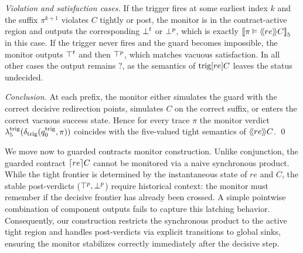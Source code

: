     \smallskip
    \emph{Violation and satisfaction cases.}
    If the trigger fires at some earliest index $k$ and the suffix $\pi^{k+1}$
    violates $C$ tightly or post, the monitor is in the contract-active region and
    outputs the corresponding $\bott$ or $\botp$, which is exactly
    $\semfive{\pi \vDash \trig[re]{C}}$ in this case.
    If the trigger never fires and the guard becomes impossible, the monitor
    outputs $\topt$ and then $\topp$, which matches vacuous satisfaction.
    In all other cases the output remains $\mathsf{?}$, as the semantics of
    $\trigg[re]{C}$ leaves the status undecided.
    
    \smallskip
    \emph{Conclusion.}
    At each prefix, the monitor either simulates the guard with the correct decisive redirection points, simulates $C$ on the correct suffix, or enters the correct vacuous success state.
    Hence
    for every trace $\pi$ the monitor verdict
    \(
    \lambda_5^{\trigg}(\delta_{\trigg}(q_0^{\trigg},\pi))
    \)
    coincides with the five-valued tight semantics of $\trig[re]{C}$.
    \qed





We move now to guarded contracts monitor construction. Unlike conjunction, the guarded contract $\guard[re]{C}$ cannot be monitored via a naive synchronous product. While the tight frontier is determined by the instantaneous state of $re$ and $C$, the stable post-verdicts ($\topp, \botp$) require historical context: the monitor must remember if the decisive frontier has already been crossed. A simple pointwise combination of component outputs fails to capture this latching behavior. Consequently, our construction restricts the synchronous product to the active tight region and handles post-verdicts via explicit transitions to global sinks, ensuring the monitor stabilizes correctly immediately after the decisive step. 


